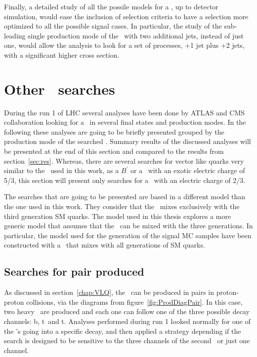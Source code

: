 Finally, a detailed study of all the possile models for a \Tp, up to detector simulation, would ease the inclusion of selection criteria to have a selection more optimized to all the possible signal cases. In particular, the study of the sub-leading single production mode of the \Tp~with two additional jets, instead of just one, would allow the analysis to look for a set of processes, \Tp+1 jet plus \Tp+2 jets, with a significant higher cross section. 

\section{Other \Tp~searches}
\label{sec:art}

During the run 1 of LHC several analyses have been done by ATLAS and CMS collaboration looking for a \Tp~in several final states and production modes. In the following these analyses are going to be briefly presented grouped by the production mode of the searched \Tp. Summary results of the discussed analyses will be presented at the end of this section and compared to the results from section~\ref{sec:res}. Whereas, there are several searches for vector like quarks very similar to the \Tp~used in this work, as a $B^{'}$ or a \Tp~with an exotic electric charge of 5/3, this section will present only searches for a \Tp~with an electric charge of 2/3. 

The searches that are going to be presented are based in a different model than the one used in this work. They consider that the \Tp~mixes exclusively with the third generation SM quarks. The model used in this thesis explores a more generic model that assumes that the \Tp~can be mixed with the three generations. In particular, the model used for the generation of the signal MC samples have been constructed with a \Tp~that mixes with all generations of SM quarks.

\subsection{Searches for pair produced \Tp}
\label{sec:pairanal}

As discussed in section~\ref{chap:VLQ}, the \Tp~can be produced in pairs in proton-proton collisions, via the diagrams from figure~\ref{fig:ProdDiagPair}. In this case, two heavy \Tp~are produced and each one can follow one of the three possible decay channels: b\W, t\Z~and t\Hb. Analyses performed during run 1 looked normally for one of the \Tp's going into a specific decay, and then applied a strategy depending if the search is designed to be sensitive to the three channels of the second \Tp~or just one channel. 

